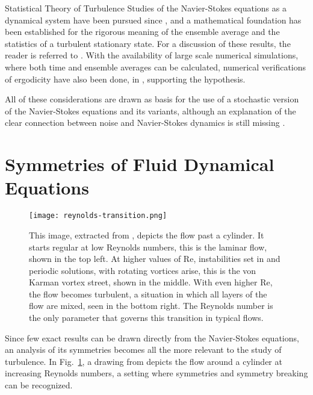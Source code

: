 \begin{chapter}{Statistical Theory of Turbulence}
Studies of the Navier-Stokes equations as a dynamical system
have been pursued since
\textcite{landau1944problem,hopf1948mathematical},
and a mathematical foundation has been established
for the rigorous meaning of the ensemble average
and the statistics of a turbulent stationary state.
For a discussion of these results, the reader is
referred to
\textcite{fursikov1988,foias2001navier}.
With the availability of large scale numerical
simulations, where both time and ensemble averages can
be calculated, numerical verifications of ergodicity
have also been done, in \textcite{galanti2004turbulence},
supporting the hypothesis.

All of these considerations are drawn as basis for the use of a stochastic version of the Navier-Stokes equations and its variants, although an explanation of the clear connection between noise and Navier-Stokes dynamics is still missing \parencite{eyink2008turbulence}.

\section{Symmetries of Fluid Dynamical Equations} \label{sec:symmetries}

\begin{figure}[ht]
    \centering
    \texttt{[image: reynolds-transition.png]}
    \caption[The laminar-turbulent transition in
    a drawing from Feynman]
    {This image, extracted from \textcite{feynman2011feynmanvol2},
    depicts the flow past a cylinder. It starts regular at low
    Reynolds numbers, this is the laminar flow, shown in the top left.
    At higher values of Re, instabilities set in
    and periodic solutions, with rotating vortices arise,
    this is the von Karman vortex street, shown in the middle.
    With even higher Re, the flow becomes turbulent, a situation
    in which all layers of the flow are mixed, seen in the bottom right.
    The Reynolds number is the only parameter that governs this transition in typical flows.}
    \label{fig:reynolds-transition}
\end{figure}

Since few exact results can be drawn directly from the Navier-Stokes
equations, an analysis of its symmetries becomes all
the more relevant to the study of turbulence.
In Fig.~\ref{fig:reynolds-transition}, a drawing from
\textcite{feynman2011feynmanvol2} depicts the flow around a cylinder
at increasing Reynolds numbers, a setting where
symmetries and symmetry breaking can be recognized.


\end{chapter}
